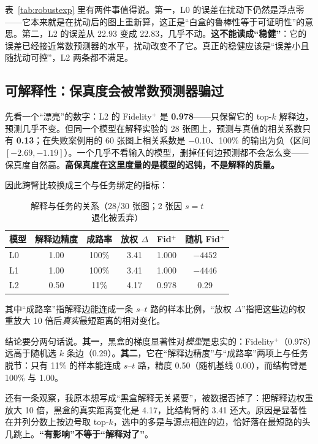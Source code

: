 表~\ref{tab:robustexp} 里有两件事值得说。第一，L0 的误差在扰动下仍然是浮点零——它本来就是在扰动后的图上重新算，这正是“白盒的鲁棒性等于可证明性”的意思。第二，L2 的误差从 22.93 变成 22.83，几乎不动。\textbf{这不能读成“稳健”}：它的误差已经接近常数预测器的水平，扰动改变不了它。真正的稳健应该是“误差小且随扰动可控”，L2 两条都不满足。

\subsection{可解释性：保真度会被常数预测器骗过}

先看一个“漂亮”的数字：L2 的 Fidelity$^+$ 是 \textbf{0.978}——只保留它的 top-$k$ 解释边，预测几乎不变。但同一个模型在解释实验的 28 张图上，预测与真值的相关系数只有 \textbf{0.13}；在失败案例用的 60 张图上相关系数是 $\mathbf{-0.10}$、100\% 的输出为负（区间 $[-2.69,-1.19]$）。一个几乎不看输入的模型，删掉任何边预测都不会怎么变——保真度自然高。\textbf{高保真度在这里度量的是模型的迟钝，不是解释的质量。}

因此跨臂比较换成三个与任务绑定的指标：

\begin{table}[H]
\centering
\caption{解释与任务的关系（28/30 张图；2 张因 $s=t$ 退化被丢弃）}
\label{tab:interp}
\small
\setlength{\tabcolsep}{4pt}
\begin{tabular}{lccccc}
\toprule
模型 & 解释边精度 & 成路率 & 放权 $\Delta$ & Fid$^+$ & 随机 Fid$^+$ \\
\midrule
L0 & 1.00 & 100\% & 3.41 & 1.000 & $-4452$ \\
L1 & 1.00 & 100\% & 3.41 & 1.000 & $-4446$ \\
L2 & 0.50 & 11\% & 4.17 & 0.978 & 0.29 \\
\bottomrule
\end{tabular}
\end{table}

其中“成路率”指解释边能连成一条 $s$--$t$ 路的样本比例，“放权 $\Delta$”指把这些边的权重放大 10 倍后\emph{真实}最短距离的相对变化。

结论要分两句话说。\textbf{其一}，黑盒的梯度显著性对\emph{模型}是忠实的：Fidelity$^+$（0.978）远高于随机选 $k$ 条边（0.29）。\textbf{其二}，它在“解释边精度”与“成路率”两项上与任务脱节：只有 11\% 的样本能连成 $s$--$t$ 路，精度 0.50（随机基线 0.00），而结构臂是 100\% 与 1.00。

还有一条观察，我原本想写成“黑盒解释无关紧要”，被数据否掉了：把解释边权重放大 10 倍，黑盒的真实距离变化是 4.17，比结构臂的 3.41 还大。原因是显著性在并列分数上按边号取 top-$k$，选中的多是与源点相连的边，恰好落在最短路的头几跳上。\textbf{“有影响”不等于“解释对了”}。

